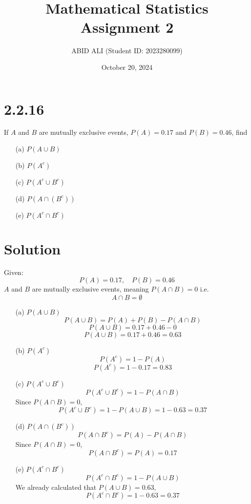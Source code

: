 \documentclass{article}
\title{Mathematical Statistics Assignment 2}
\author{ABID ALI (Student ID: 2023280099)}
\date{October 20, 2024}
\begin{document}
\maketitle

\newpage %

\section*{2.2.16}
If $A$ and $B$ are mutually exclusive events, $P(A) = 0.17$ and $P(B) = 0.46$, find

\begin{enumerate}
    \item[(a)] $P(A \cup B)$
    \item[(b)] $P(A^c)$
    \item[(c)] $P(A^c \cup B^c)$
    \item[(d)] $P(A \cap (B^c))$
    \item[(e)] $P(A^c \cap B^c)$
\end{enumerate}

\section*{Solution}

Given:
\[
P(A) = 0.17, \quad P(B) = 0.46
\]
\(A\) and \(B\) are mutually exclusive events, meaning \(P(A \cap B) = 0\) 
i.e. \[A \cap B = \emptyset\]


\begin{enumerate}
    \item[(a)] \(P(A \cup B)\)
    \[
    P(A \cup B) = P(A) + P(B)-P(A \cap B)
    \]
    \[
    P(A \cup B) = 0.17 + 0.46 -0 \]
    \[
    P(A \cup B) = 0.17 + 0.46 = 0.63
    \]
    
    \item[(b)] \(P(A^c)\)
    \[
    P(A^c) = 1 - P(A)
    \]
    \[
    P(A^c) = 1 - 0.17 = 0.83
    \]
    
    \item[(c)] \(P(A^c \cup B^c)\)
    \[
    P(A^c \cup B^c) = 1 - P(A \cap B)
    \]
    Since \(P(A \cap B) = 0\),
    \[
    P(A^c \cup B^c) = 1 - P(A \cup B) = 1 - 0.63 = 0.37
    \]
    
    \item[(d)] \(P(A \cap (B^c))\)
    \[
    P(A \cap B^c) = P(A) - P(A \cap B)
    \]
    Since \(P(A \cap B) = 0\),
    \[
    P(A \cap B^c) = P(A) = 0.17
    \]
    
    \item[(e)] \(P(A^c \cap B^c)\)
    \[
    P(A^c \cap B^c) = 1 - P(A \cup B)
    \]
    We already calculated that \(P(A \cup B) = 0.63\),
    \[
    P(A^c \cap B^c) = 1 - 0.63 = 0.37
    \]
    
\end{enumerate}
\end{document}
